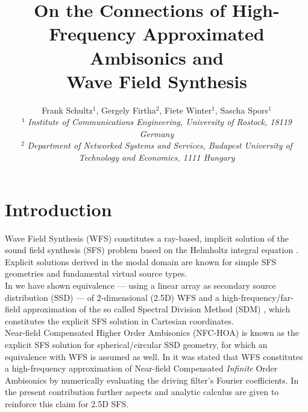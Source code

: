 \documentclass[a4paper, 10pt, twocolumn]{article}
\def\NewL{\\\noindent\hspace*{3mm}}
\begin{document}
\date{}                                         %
%





\title{\vspace{-8mm}\textbf{\large
On the Connections of High-Frequency Approximated Ambisonics and\\Wave Field Synthesis}}

\author{
Frank Schultz$^1$, Gergely Firtha$^2$, Fiete Winter$^1$, Sascha Spors$^1$\\
$^1$ \emph{\small Institute of Communications Engineering, University of Rostock, 18119 Germany}\\
$^2$ \emph{\small Department of Networked Systems and Services, Budapest University of Technology and Economics, 1111 Hungary} } \maketitle
\thispagestyle{empty}           %
\section*{Introduction}
\label{sec:Introduction}
\noindent\hspace*{2mm} Wave Field Synthesis (WFS) constitutes a ray-based, implicit solution of the
sound field synthesis (SFS) problem based on the Helmholtz integral equation \cite{FirthaIEEE2018}.
Explicit solutions derived in the modal domain are known for simple SFS geometries and 
fundamental virtual source types.
%
%
%
\NewL In \cite{FirthaIEEE2018} we have shown equivalence --- using a linear array
as secondary source distribution (SSD) --- of 
2-dimensional (2.5D) 
WFS and a high-frequency/far-field
approximation of the so called Spectral
Division Method (SDM) \cite[Sec. 3.7]{AhrensBook}, which constitutes the explicit SFS 
solution in Cartesian coordinates.
%
%
%
\NewL Near-field Compensated Higher Order Ambisonics (NFC-HOA)  \cite[Sec. 3.5]{AhrensBook} 
is known as the explicit
SFS solution for spherical/circular SSD geometry, for which an equivalence with WFS
is assumed as well. 
In \cite[Sec. 4.4.2]{AhrensBook} it was stated
that WFS constitutes a high-frequency approximation of 
Near-field Compensated \textit{Infinite} Order Ambisonics
by numerically evaluating the driving filter's Fourier coefficients.
%
%
%
In the present contribution further aspects and
analytic calculus are given to reinforce this claim for 2.5D SFS.
\end{document}
